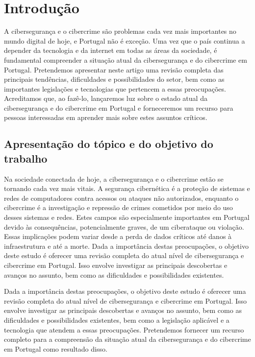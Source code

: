 \chapter{Introdução}

A cibersegurança e o cibercrime são problemas cada vez mais importantes no mundo digital de hoje, e Portugal não é exceção. Uma vez que o país continua a depender da tecnologia e da internet em todas as áreas da sociedade, é fundamental compreender a situação atual da cibersegurança e do cibercrime em Portugal. Pretendemos apresentar neste artigo uma revisão completa das principais tendências, dificuldades e possibilidades do setor, bem como as importantes legislações e tecnologias que pertencem a essas preocupações. Acreditamos que, ao fazê-lo, lançaremos luz sobre o estado atual da cibersegurança e do cibercrime em Portugal e forneceremos um recurso para pessoas interessadas em aprender mais sobre estes assuntos críticos.

\section{Apresentação do tópico e do objetivo do trabalho}

Na sociedade conectada de hoje, a cibersegurança e o cibercrime estão se tornando cada vez mais vitais. A segurança cibernética é a proteção de sistemas e redes de computadores contra acessos ou ataques não autorizados, enquanto o cibercrime é a investigação e repressão de crimes cometidos por meio do uso desses sistemas e redes. Estes campos são especialmente importantes em Portugal devido às consequências, potencialmente graves, de um ciberataque ou violação. Essas implicações podem variar desde a perda de dados críticos até danos à infraestrutura e até a morte. Dada a importância destas preocupações, o objetivo deste estudo é oferecer uma revisão completa do atual nível de cibersegurança e cibercrime em Portugal. Isso envolve investigar as principais descobertas e avanços no assunto, bem como as dificuldades e possibilidades existentes.

Dada a importância destas preocupações, o objetivo deste estudo é oferecer uma revisão completa do atual nível de cibersegurança e cibercrime em Portugal. Isso envolve investigar as principais descobertas e avanços no assunto, bem como as dificuldades e possibilidades existentes, bem como a legislação aplicável e a tecnologia que atendem a essas preocupações. Pretendemos fornecer um recurso completo para a compreensão da situação atual da cibersegurança e do cibercrime em Portugal como resultado disso.

